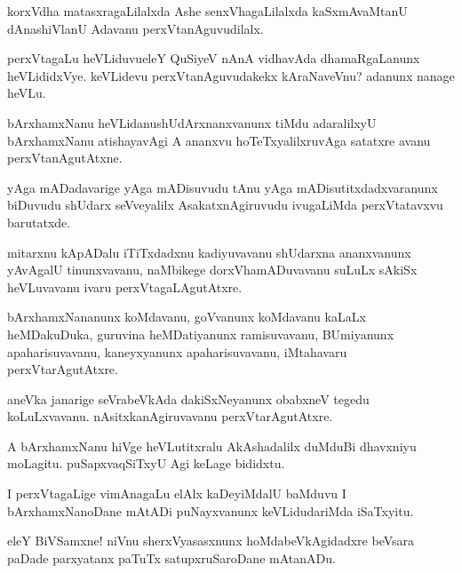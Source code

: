 \begin{mng}
korxVdha matasxragaLilalxda Ashe senxVhagaLilalxda kaSxmAvaMtanU dAnashiVlanU Adavanu perxVtanAguvudilalx.
\end{mng}

\begin{mng}
perxVtagaLu heVLiduvu\mdash eleY QuSiyeV nAnA vidhavAda dhamaRgaLanunx heVLididxVye. keVLidevu perxVtanAguvudakekx kAraNaveVnu? adanunx nanage heVLu.
\end{mng}

\begin{mng}
bArxhamxNanu heVLidanu\mdash shUdArxnanxvanunx tiMdu adaralilxyU bArxhamxNanu atishayavAgi A ananxvu hoTeTxyalilxruvAga satatxre avanu perxVtanAgutAtxne.
\end{mng}

\begin{mng}
yAga mADadavarige yAga mADisuvudu tAnu yAga mADisutitxdadxvaranunx biDuvudu shUdarx seVveyalilx AsakatxnAgiruvudu ivugaLiMda perxVtatavxvu barutatxde.
\end{mng}

\begin{mng}
mitarxnu kApADalu iTiTxdadxnu kadiyuvavanu shUdarxna ananxvanunx yAvAgalU tinunxvavanu, naMbikege dorxVhamADuvavanu suLuLx sAkiSx heVLuvavanu ivaru perxVtagaLAgutAtxre.
\end{mng}

\begin{mng}
bArxhamxNananunx koMdavanu, goVvanunx koMdavanu kaLaLx heMDakuDuka, guruvina heMDatiyanunx ramisuvavanu, BUmiyanunx apaharisuvavanu, kaneyxyanunx apaharisuvavanu, iMtahavaru perxVtarAgutAtxre.
\end{mng}

\begin{mng}
aneVka janarige seVrabeVkAda dakiSxNeyanunx obabxneV tegedu koLuLxvavanu. nAsitxkanAgiruvavanu perxVtarAgutAtxre.
\end{mng}

\begin{mng}
A bArxhamxNanu hiVge heVLutitxralu AkAshadalilx duMduBi dhavxniyu moLagitu. puSapxvaqSiTxyU Agi keLage bididxtu.
\end{mng}

\begin{mng}
I perxVtagaLige vimAnagaLu elAlx kaDeyiMdalU baMduvu I bArxhamxNanoDane mAtADi puNayxvanunx keVLidudariMda iSaTxyitu.
\end{mng}

\begin{mng}
eleY BiVSamxne! niVnu sherxVyasasxnunx hoMdabeVkAgidadxre beVsara paDade parxyatanx paTuTx satupxruSaroDane mAtanADu.
\end{mng}

